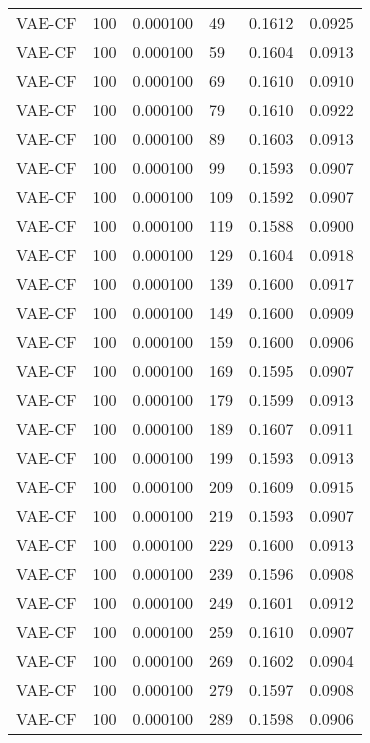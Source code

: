 \begin{tabular}{llrlrr}
  VAE-CF &  100 &  0.000100 &    49 &  0.1612 &       0.0925 \\
  VAE-CF &  100 &  0.000100 &    59 &  0.1604 &       0.0913 \\
  VAE-CF &  100 &  0.000100 &    69 &  0.1610 &       0.0910 \\
  VAE-CF &  100 &  0.000100 &    79 &  0.1610 &       0.0922 \\
  VAE-CF &  100 &  0.000100 &    89 &  0.1603 &       0.0913 \\
  VAE-CF &  100 &  0.000100 &    99 &  0.1593 &       0.0907 \\
  VAE-CF &  100 &  0.000100 &   109 &  0.1592 &       0.0907 \\
  VAE-CF &  100 &  0.000100 &   119 &  0.1588 &       0.0900 \\
  VAE-CF &  100 &  0.000100 &   129 &  0.1604 &       0.0918 \\
  VAE-CF &  100 &  0.000100 &   139 &  0.1600 &       0.0917 \\
  VAE-CF &  100 &  0.000100 &   149 &  0.1600 &       0.0909 \\
  VAE-CF &  100 &  0.000100 &   159 &  0.1600 &       0.0906 \\
  VAE-CF &  100 &  0.000100 &   169 &  0.1595 &       0.0907 \\
  VAE-CF &  100 &  0.000100 &   179 &  0.1599 &       0.0913 \\
  VAE-CF &  100 &  0.000100 &   189 &  0.1607 &       0.0911 \\
  VAE-CF &  100 &  0.000100 &   199 &  0.1593 &       0.0913 \\
  VAE-CF &  100 &  0.000100 &   209 &  0.1609 &       0.0915 \\
  VAE-CF &  100 &  0.000100 &   219 &  0.1593 &       0.0907 \\
  VAE-CF &  100 &  0.000100 &   229 &  0.1600 &       0.0913 \\
  VAE-CF &  100 &  0.000100 &   239 &  0.1596 &       0.0908 \\
  VAE-CF &  100 &  0.000100 &   249 &  0.1601 &       0.0912 \\
  VAE-CF &  100 &  0.000100 &   259 &  0.1610 &       0.0907 \\
  VAE-CF &  100 &  0.000100 &   269 &  0.1602 &       0.0904 \\
  VAE-CF &  100 &  0.000100 &   279 &  0.1597 &       0.0908 \\
  VAE-CF &  100 &  0.000100 &   289 &  0.1598 &       0.0906 \\

\end{tabular}

